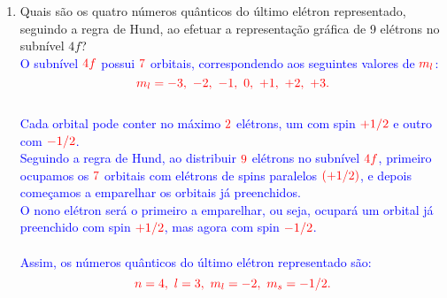 \documentclass[a4paper, 12pt]{article}
\begin{document}
\begin{enumerate}
\begin{enumerate}
	      \end{enumerate}
	      \pagebreak
	\item Quais são os quatro números quânticos do último elétron representado, seguindo a regra de Hund, ao efetuar a representação gráfica de 9 elétrons no subnível \(4f\)?
	      \\[10pt]
	      \textcolor{blue}{
		      O subnível \(\textcolor{red}{4f}\) possui \(\textcolor{red}{7}\) orbitais, correspondendo aos seguintes valores de \(\textcolor{red}{m_l}\):
		      \[
			      \textcolor{red}{m_l = -3, \ -2, \ -1, \  0, \ +1, \ +2, \ +3.}
		      \]
		      \\
		      \textcolor{blue}{Cada orbital pode conter no máximo \(\textcolor{red}{2}\) elétrons, um com spin \(\textcolor{red}{+1/2}\) e outro com \(\textcolor{red}{-1/2}\).} \\[2mm]
		      \textcolor{blue}{Seguindo a regra de Hund, ao distribuir \(\textcolor{red}{9}\) elétrons no subnível \(\textcolor{red}{4f}\), primeiro ocupamos os \(\textcolor{red}{7}\) orbitais com elétrons de spins paralelos \(\textcolor{red}{(+1/2)}\), e depois começamos a emparelhar os orbitais já preenchidos.} \\[2mm]
		      \textcolor{blue}{O nono elétron será o primeiro a emparelhar, ou seja, ocupará um orbital já preenchido com spin \(\textcolor{red}{+1/2}\), mas agora com spin \(\textcolor{red}{-1/2}\).} \\[2mm]
		      
		      \\
		      \textcolor{blue}{Assim, os números quânticos do último elétron representado são:}
		      \[
			      \textcolor{red}{n = 4, \ l = 3, \ m_l = -2, \ m_s = -1/2.}
		      \]
	      }
	      

\end{enumerate}
\end{document}
